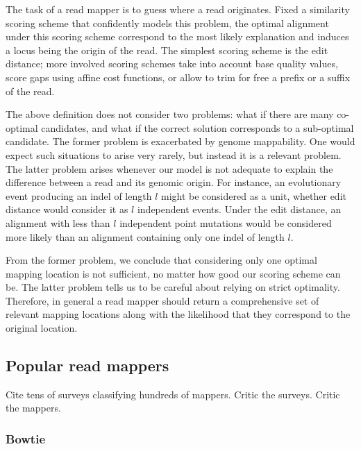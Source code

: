 The task of a read mapper is to guess where a read originates.
Fixed a similarity scoring scheme that confidently models this problem, the optimal alignment under this scoring scheme correspond to the most likely explanation and induces a locus being the origin of the read.
The simplest scoring scheme is the edit distance; more involved scoring schemes take into account base quality values, score gaps using affine cost functions, or allow to trim for free a prefix or a suffix of the read.

The above definition does not consider two problems: what if there are many co-optimal candidates, and what if the correct solution corresponds to a sub-optimal candidate.
The former problem is exacerbated by genome mappability.
One would expect such situations to arise very rarely, but instead it is a relevant problem.
The latter problem arises whenever our model is not adequate to explain the difference between a read and its genomic origin.
For instance, an evolutionary event producing an indel of length $l$ might be considered as a unit, whether edit distance would consider it as $l$ independent events.
Under the edit distance, an alignment with less than $l$ independent point mutations would be considered more likely than an alignment containing only one indel of length $l$.

From the former problem, we conclude that considering only one optimal mapping location is not sufficient, no matter how good our scoring scheme can be.
The latter problem tells us to be careful about relying on strict optimality.
Therefore, in general a read mapper should return a comprehensive set of relevant mapping locations along with the likelihood that they correspond to the original location.

\subsection{Popular read mappers}

Cite tens of surveys classifying hundreds of mappers.
Critic the surveys.
Critic the mappers.

\begin{table}[h]
  \center
  \sffamily
  \resizebox{1.0\textwidth}{!}
  {
	\renewcommand{\tabcolsep}{0.8ex}
	
  }
\end{table}

\subsubsection{Bowtie}

